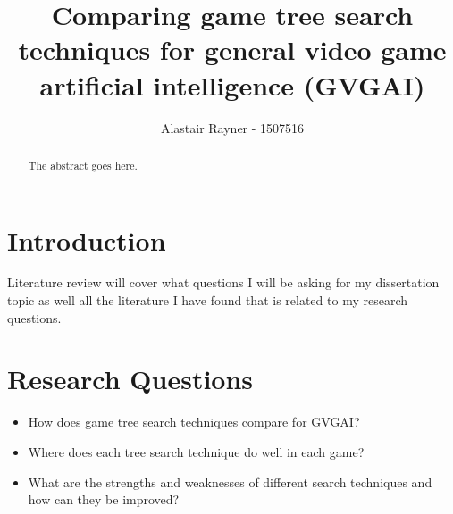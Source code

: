 \documentclass[journal]{IEEEtran}
\begin{document}
%
\title{Comparing game tree search techniques for general video game artificial intelligence (GVGAI)}
%
%
\author{Alastair Rayner - 1507516}


\maketitle

\begin{abstract}
The abstract goes here.
\end{abstract}

\section{Introduction}
 Literature review will cover what questions I will be asking for my dissertation topic as well all the literature I have found that is related to my research questions.





\section{Research Questions}

\begin{itemize}
    \item How does game tree search techniques compare for GVGAI? 
    \item Where does each tree search technique do well in each game? 
    \item What are the strengths and weaknesses of different search techniques and how can they be improved? 
\end{itemize}
\end{document}
